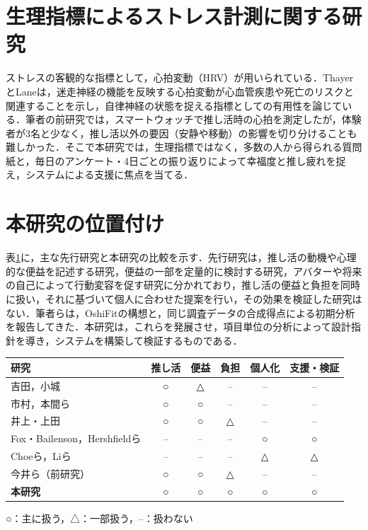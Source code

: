 \section{生理指標によるストレス計測に関する研究}
ストレスの客観的な指標として，心拍変動（HRV）が用いられている．ThayerとLane\cite{thayer2007}は，迷走神経の機能を反映する心拍変動が心血管疾患や死亡のリスクと関連することを示し，自律神経の状態を捉える指標としての有用性を論じている．筆者の前研究\cite{imai2025hr}では，スマートウォッチで推し活時の心拍を測定したが，体験者が3名と少なく，推し活以外の要因（安静や移動）の影響を切り分けることも難しかった．そこで本研究では，生理指標ではなく，多数の人から得られる質問紙と，毎日のアンケート・4日ごとの振り返りによって幸福度と推し疲れを捉え，システムによる支援に焦点を当てる．

\section{本研究の位置付け}
表\ref{tab:position}に，主な先行研究と本研究の比較を示す．先行研究は，推し活の動機や心理的な便益を記述する研究，便益の一部を定量的に検討する研究，アバターや将来の自己によって行動変容を促す研究に分かれており，推し活の便益と負担を同時に扱い，それに基づいて個人に合わせた提案を行い，その効果を検証した研究はない．筆者らは，OshiFitの構想\cite{imai2026ievc}と，同じ調査データの合成得点による初期分析\cite{imai2026g43}を報告してきた．本研究は，これらを発展させ，項目単位の分析によって設計指針を導き，システムを構築して検証するものである．

\begin{table}[t]
\centering
{}
\label{tab:position}
\small
\begin{tabular}{@{}lccccc@{}}
\toprule
研究 & 推し活 & 便益 & 負担 & 個人化 & 支援・検証 \\
\midrule
吉田\cite{yoshida2010}，小城\cite{koshiro2018} & ○ & △ & -- & -- & -- \\
市村\cite{ichimura2025}，本間ら\cite{homma2025} & ○ & ○ & -- & -- & -- \\
井上・上田\cite{inoue2023,ueda2023} & ○ & ○ & △ & -- & -- \\
Fox・Bailenson\cite{fox2009}，Hershfieldら\cite{hershfield2011} & -- & -- & -- & ○ & ○ \\
Choeら\cite{choe2014}，Liら\cite{li2010} & -- & -- & -- & △ & △ \\
今井ら（前研究）\cite{imai2025hr} & ○ & ○ & △ & -- & -- \\
\textbf{本研究} & ○ & ○ & ○ & ○ & ○ \\
\bottomrule
\end{tabular}

\vspace{2mm}
{\footnotesize ○：主に扱う，△：一部扱う，--：扱わない}
\end{table}
